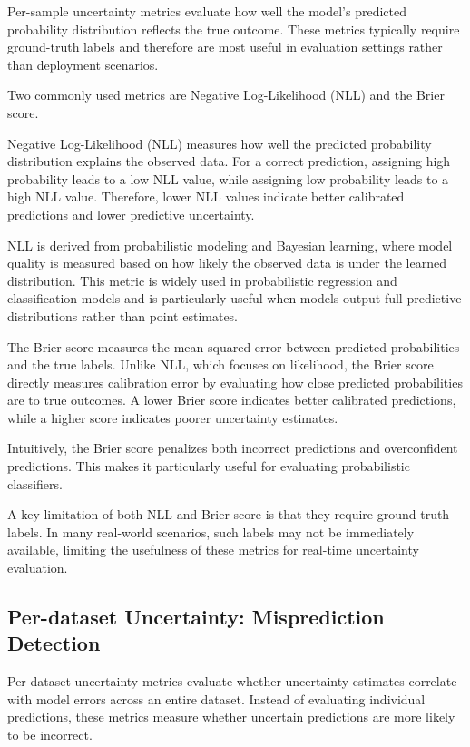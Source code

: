 \documentclass{article}
\begin{document}
Per-sample uncertainty metrics evaluate how well the model's predicted probability distribution reflects the true outcome. These metrics typically require ground-truth labels and therefore are most useful in evaluation settings rather than deployment scenarios.

Two commonly used metrics are Negative Log-Likelihood (NLL) and the Brier score.

Negative Log-Likelihood (NLL) measures how well the predicted probability distribution explains the observed data. For a correct prediction, assigning high probability leads to a low NLL value, while assigning low probability leads to a high NLL value. Therefore, lower NLL values indicate better calibrated predictions and lower predictive uncertainty.

NLL is derived from probabilistic modeling and Bayesian learning, where model quality is measured based on how likely the observed data is under the learned distribution. This metric is widely used in probabilistic regression and classification models and is particularly useful when models output full predictive distributions rather than point estimates.

The Brier score measures the mean squared error between predicted probabilities and the true labels. Unlike NLL, which focuses on likelihood, the Brier score directly measures calibration error by evaluating how close predicted probabilities are to true outcomes. A lower Brier score indicates better calibrated predictions, while a higher score indicates poorer uncertainty estimates.

Intuitively, the Brier score penalizes both incorrect predictions and overconfident predictions. This makes it particularly useful for evaluating probabilistic classifiers.

A key limitation of both NLL and Brier score is that they require ground-truth labels. In many real-world scenarios, such labels may not be immediately available, limiting the usefulness of these metrics for real-time uncertainty evaluation.

\subsection{Per-dataset Uncertainty: Misprediction Detection}

Per-dataset uncertainty metrics evaluate whether uncertainty estimates correlate with model errors across an entire dataset. Instead of evaluating individual predictions, these metrics measure whether uncertain predictions are more likely to be incorrect.
\end{document}
